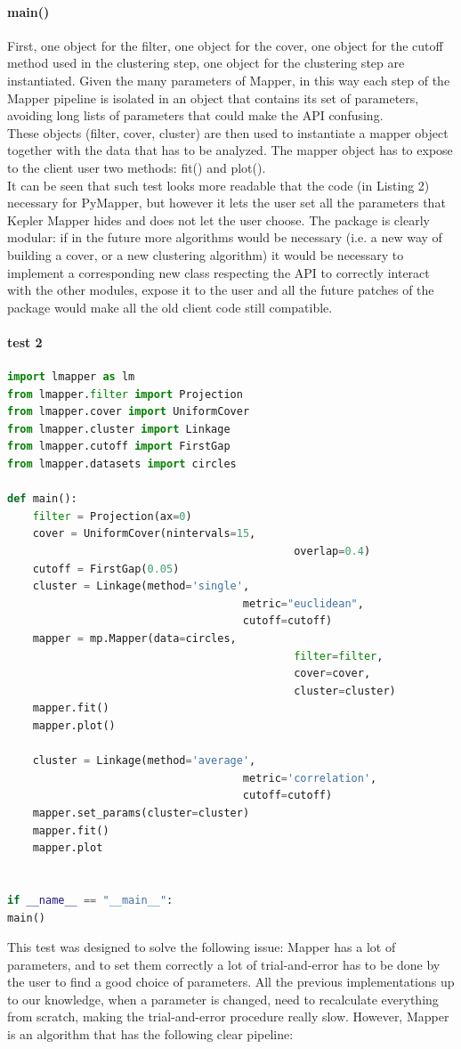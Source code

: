 \paragraph{main()}
First, one object for the filter, one object for the cover, one object for the cutoff method used in the clustering step, one object for the clustering step are instantiated. Given the many parameters of Mapper, in this way each step of the Mapper pipeline is isolated in an object that contains its set of parameters, avoiding long lists of parameters that could make the API confusing.\\
These objects (filter, cover, cluster) are then used to instantiate a mapper object together with the data that has to be analyzed. The mapper object has to expose to the client user two methods: fit() and plot().\\
It can be seen that such test looks more readable that the code (in Listing 2) necessary for PyMapper, but however it lets the user set all the parameters that Kepler Mapper hides and does not let the user choose. The package is clearly modular: if in the future more algorithms would be necessary (i.e. a new way of building a cover, or a new clustering algorithm) it would be necessary to implement a corresponding new class respecting the API to correctly interact with the other modules, expose it to the user and all the future patches of the package would make all the old client code still compatible.\\

\paragraph{test 2}
\begin{lstlisting}[language=Python, caption=Second test for Mapper]
import lmapper as lm
from lmapper.filter import Projection
from lmapper.cover import UniformCover
from lmapper.cluster import Linkage
from lmapper.cutoff import FirstGap
from lmapper.datasets import circles

def main():
	filter = Projection(ax=0)
	cover = UniformCover(nintervals=15,
											 overlap=0.4)
	cutoff = FirstGap(0.05)
 	cluster = Linkage(method='single',
									 metric="euclidean",
									 cutoff=cutoff)
	mapper = mp.Mapper(data=circles,
											 filter=filter,
											 cover=cover,
											 cluster=cluster)
	mapper.fit()
	mapper.plot()
	
	cluster = Linkage(method='average',
									 metric='correlation',
									 cutoff=cutoff)
	mapper.set_params(cluster=cluster)
	mapper.fit()
	mapper.plot


if __name__ == "__main__":
main()

\end{lstlisting}
This test was designed to solve the following issue: Mapper has a lot of parameters, and to set them correctly a lot of trial-and-error has to be done by the user to find a good choice of parameters. All the previous implementations up to our knowledge, when a parameter is changed, need to recalculate everything from scratch, making the trial-and-error procedure really slow. However, Mapper is an algorithm that has the following clear pipeline:

